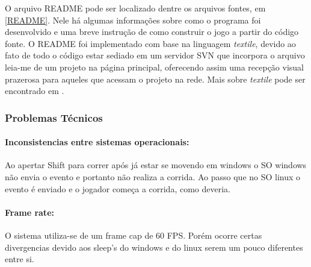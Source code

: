 O arquivo README pode ser localizado dentre os arquivos fontes, em \ref{README}. Nele há algumas informações sobre como o programa foi desenvolvido e uma breve instrução de como construir o jogo a partir do código fonte. O README foi implementado com base na linguagem \textit{textile}, devido ao fato de todo o código estar sediado em um servidor SVN que incorpora o arquivo leia-me de um projeto na página principal, oferecendo assim uma recepção visual prazerosa para aqueles que acessam o projeto na rede. Mais sobre \textit{textile} pode ser encontrado em \cite{textile}.

\subsubsection{Problemas Técnicos}\label{problens}

\paragraph{\textbf{Inconsistencias entre sistemas operacionais:}}
Ao apertar Shift para correr após já estar se movendo em windows o SO windows 
não envia o evento e portanto não realiza a corrida. Ao passo que no SO linux o evento 
é enviado e o jogador começa a corrida, como deveria.

\paragraph{\textbf{Frame rate:}}
O sistema utiliza-se de um frame cap de 60 FPS. Porém ocorre certas divergencias 
devido aos sleep's do windows e do linux serem um pouco diferentes entre si.



